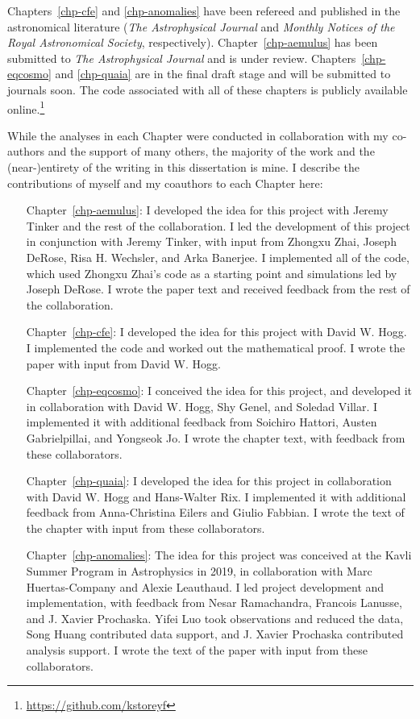 Chapters~\ref{chp-cfe} and \ref{chp-anomalies} have been refereed and published in the astronomical literature (\emph{The Astrophysical Journal} and \emph{Monthly Notices of the Royal Astronomical Society}, respectively).
Chapter~\ref{chp-aemulus} has been submitted to \emph{The Astrophysical Journal} and is under review.
Chapters~\ref{chp-eqcosmo} and \ref{chp-quaia} are in the final draft stage and will be submitted to journals soon.
The code associated with all of these chapters is publicly available online.\footnote{\url{https://github.com/kstoreyf}}

While the analyses in each Chapter were conducted in collaboration with my co-authors and the support of many others, the majority of the work and the (near-)entirety of the writing in this dissertation is mine. 
I describe the contributions of myself and my coauthors to each Chapter here:
\begin{enumerate}[leftmargin=4\parindent]
    \item[Chapter~\ref{chp-aemulus}:] I developed the idea for this project with Jeremy Tinker and the rest of the \aemulus collaboration. I led the development of this project in conjunction with Jeremy Tinker, with input from Zhongxu Zhai, Joseph DeRose, Risa H. Wechsler, and Arka Banerjee. I implemented all of the code, which used Zhongxu Zhai's code as a starting point and simulations led by Joseph DeRose. I wrote the paper text and received feedback from the rest of the collaboration.
    \item[Chapter~\ref{chp-cfe}:] I developed the idea for this project with David W. Hogg. I implemented the code and worked out the mathematical proof. I wrote the paper with input from David W. Hogg.
    \item[Chapter~\ref{chp-eqcosmo}:] I conceived the idea for this project, and developed it in collaboration with David W. Hogg, Shy Genel, and Soledad Villar. I implemented it with additional feedback from Soichiro Hattori, Austen Gabrielpillai, and Yongseok Jo. I wrote the chapter text, with feedback from these collaborators.
    \item[Chapter~\ref{chp-quaia}:] I developed the idea for this project in collaboration with David W. Hogg and Hans-Walter Rix. I implemented it with additional feedback from Anna-Christina Eilers and Giulio Fabbian. I wrote the text of the chapter with input from these collaborators.
    \item[Chapter~\ref{chp-anomalies}:] The idea for this project was conceived at the Kavli Summer Program in Astrophysics in 2019, in collaboration with Marc Huertas-Company and Alexie Leauthaud. I led project development and implementation, with feedback from Nesar Ramachandra, Francois Lanusse, and J. Xavier Prochaska. Yifei Luo took observations and reduced the data, Song Huang contributed data support, and J. Xavier Prochaska contributed analysis support. I wrote the text of the paper with input from these collaborators.
\end{enumerate}


